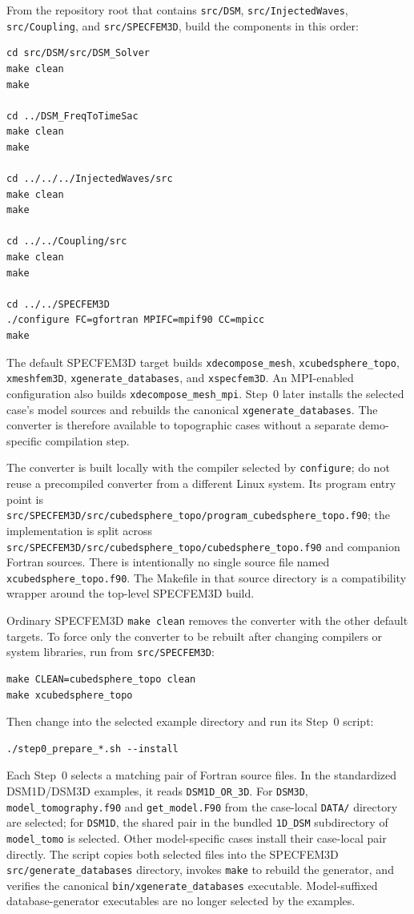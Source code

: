 \documentclass[11pt,oneside]{book}
\DeclareRobustCommand{\code}[1]{\nolinkurl{#1}}
\begin{document}
From the repository root that contains \code{src/DSM}, \code{src/InjectedWaves},
\code{src/Coupling}, and \code{src/SPECFEM3D}, build the components in this
order:
\begin{lstlisting}
cd src/DSM/src/DSM_Solver
make clean
make

cd ../DSM_FreqToTimeSac
make clean
make

cd ../../../InjectedWaves/src
make clean
make

cd ../../Coupling/src
make clean
make

cd ../../SPECFEM3D
./configure FC=gfortran MPIFC=mpif90 CC=mpicc
make
\end{lstlisting}

The default SPECFEM3D target builds \code{xdecompose_mesh},
\code{xcubedsphere_topo}, \code{xmeshfem3D},
\code{xgenerate_databases}, and \code{xspecfem3D}. An MPI-enabled
configuration also builds \code{xdecompose_mesh_mpi}. Step~0 later installs
the selected case's model sources and rebuilds the canonical
\code{xgenerate_databases}. The converter is therefore available to
topographic cases without a separate demo-specific compilation step.

The converter is built locally with the compiler selected by
\code{configure}; do not reuse a precompiled converter from a different Linux
system. Its program entry point is
\code{src/SPECFEM3D/src/cubedsphere_topo/program_cubedsphere_topo.f90}; the
implementation is split across
\code{src/SPECFEM3D/src/cubedsphere_topo/cubedsphere_topo.f90} and companion
Fortran sources.
There is intentionally no single source file named
\code{xcubedsphere_topo.f90}. The Makefile in that source directory is a
compatibility wrapper around the top-level SPECFEM3D build.

Ordinary SPECFEM3D \code{make clean} removes the converter with the other
default targets. To force only the converter to be rebuilt after changing
compilers or system libraries, run from \code{src/SPECFEM3D}:
\begin{lstlisting}
make CLEAN=cubedsphere_topo clean
make xcubedsphere_topo
\end{lstlisting}

Then change into the selected example directory and run its Step~0 script:
\begin{lstlisting}
./step0_prepare_*.sh --install
\end{lstlisting}
Each Step~0 selects a matching pair of Fortran source files. In the standardized
DSM1D/DSM3D examples, it reads \code{DSM1D_OR_3D}. For \code{DSM3D}, \code{model_tomography.f90} and \code{get_model.F90}
from the case-local \code{DATA/} directory are selected; for \code{DSM1D}, the shared pair in the bundled \code{1D_DSM} subdirectory of
\code{model_tomo} is selected. Other model-specific cases
install their case-local pair directly. The script copies both selected files
into the SPECFEM3D \code{src/generate_databases} directory, invokes
\code{make} to rebuild the generator, and verifies the canonical
\code{bin/xgenerate_databases} executable. Model-suffixed database-generator
executables are no longer selected by the examples.
\end{document}
